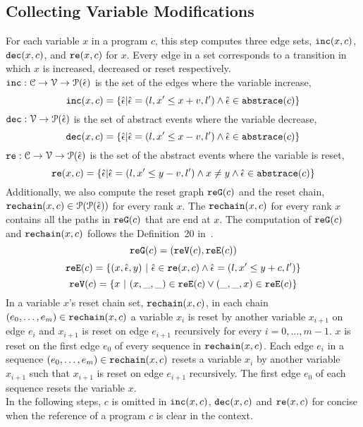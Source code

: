   \subsection{Collecting Variable Modifications}
  For each variable $x$ in a program $c$, this step computes three edge sets, $\mathtt{inc}(x, c)$, $\mathtt{dec}(x, c)$,
  and $\mathtt{re}(x, c)$ for $x$.
  Every edge in a set corresponds to a transition in which $x$ is increased,
  decreased
  or reset
  respectively.
  \\
  $\mathtt{inc}: \mathcal{C} \to \mathcal{V} \to \mathcal{P}(\hat{\mathtt{\epsilon}{}}) $
  is the set of the edges where the variable increase, 
  \[ \inc(x, c) = \left\{ \absevent | \absevent = (l, x' \leq x + v, l') \land \absevent \in \absflow(c) \right\} \]
  $\mathtt{dec}: \mathcal{V} \to \mathcal{P}(\hat{\mathtt{\epsilon}{}}) $
  is the set of abstract events where the variable decrease,
  \[\dec(x, c) = \left\{\absevent| \absevent = (l,  x' \leq x - v, l') \land \absevent \in \absflow(c) \right\}\]
  $\mathtt{re}: \mathcal{C} \to \mathcal{V} \to \mathcal{P}(\hat{\mathtt{\epsilon}{}}) $ is the set of the abstract events where the variable is reset,
%
  \[\reset(x, c) = \left\{ \absevent| \absevent = (l,  x' \leq y - v, l') \land x \neq y \land \absevent \in \absflow(c) \right\}\]
  Additionally,
  we also compute the reset graph $\mathtt{re{G}}(c)$ and the reset chain, $\mathtt{rechain}(x, c) \in \mathcal{P}(\mathcal{P}(\hat{\mathtt{\epsilon}{}}))$ for every rank $x$.
  The $\mathtt{rechain}(x, c)$ for every rank $x$ contains all the paths in $\mathtt{re{G}}(c)$ that are end at $x$.
  The computation of $\mathtt{re{G}}(c)$ and $\mathtt{rechain}(x, c)$ follows the Definition~20 in~\cite{SinnZV17}.
  \[\mathtt{re{G}}(c) = (\mathtt{re{V}}(c), \mathtt{re{E}}(c))\]
  \[\resetE(c) = \left\{ (x, \absevent, y) ~\vert~ \absevent \in \reset(x, c) \land \absevent = (l, x' \leq y + c, l') \right\} \]
  \[\resetV(c) = \left\{ x ~\vert~ (x, \_, \_) \in \resetE(c) \lor (\_, \_, x) \in \resetE(c) \right\} \]
  In a variable $x$'s reset chain set, $\mathtt{rechain}(x, c)$, in each chain $(e_0, \ldots, e_m) \in \mathtt{rechain}(x, c)$
  a variable $x_i$ is reset by another variable $x_{i + 1}$ on edge $e_{i}$
  and $x_{i + 1}$ is reset on edge $e_{i + 1}$ recursively
  for every $i = 0, \ldots, m - 1$.
  $x$ is reset on the first edge $e_0$ of every sequence in $\mathtt{rechain}(x, c)$.
  {Each edge $e_i$ in a sequence $(e_0, \ldots, e_m) \in \mathtt{rechain}(x, c)$
  resets a variable $x_i$ by another variable $x_{i + 1}$ such that $x_{i + 1}$
  is reset on edge $e_{i + 1}$ recursively. The first edge $e_0$ of each sequence resets the variable $x$.}
  \\
  In the following steps, $c$ is omitted in $\mathtt{inc}(x, c)$,
  $\mathtt{dec}(x, c)$ and $\mathtt{re}(x, c)$ for concise when the reference of a program $c$ is clear in the context.

